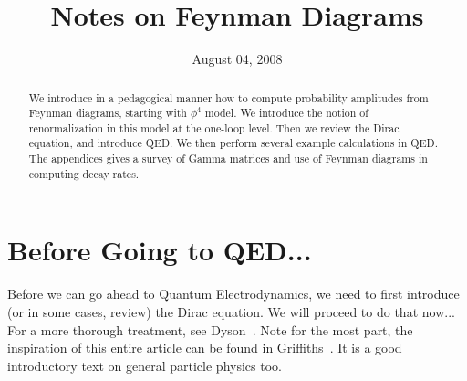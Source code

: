 \documentclass{amsart}
\title{Notes on Feynman Diagrams}
\date{August 04, 2008}
\begin{document}
\setlength{\unitlength}{1mm}
\begin{abstract}
We introduce in a pedagogical manner how to compute probability amplitudes
from Feynman diagrams, starting with $\phi^4$ model. We introduce the notion of
renormalization in this model at the one-loop level. Then we review the Dirac
equation, and introduce QED. We then perform several example calculations in
QED. The appendices gives a survey of Gamma matrices and use of Feynman diagrams
in computing decay rates.
\end{abstract}
\maketitle{}


\section*{Before Going to QED...}

Before we can go ahead to Quantum Electrodynamics, we need to first introduce
(or in some cases, review) the Dirac equation. We will proceed to do that now...
For a more thorough treatment, see Dyson~\cite{Dyson:2006cp}. Note for the most
part, the inspiration of this entire article can be found in Griffiths~\cite{griffiths}.
It is a good introductory text on general particle physics too.


\appendix


\nocite{thaller1992de}\nocite{mandlShaw}\nocite{peskinSchroeder}


\end{document}
